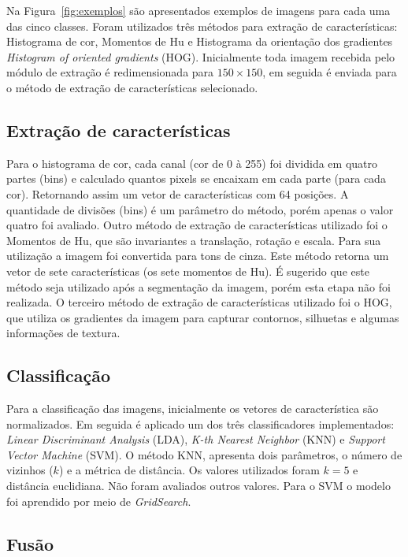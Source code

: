 \documentclass[journal]{IEEEtran}
\begin{document}
Na Figura~\ref{fig:exemplos} são apresentados exemplos de imagens para cada uma das cinco classes.
Foram utilizados três métodos para extração de características: Histograma de cor, Momentos de Hu e Histograma da orientação dos gradientes {\it Histogram of oriented gradients} (HOG).
Inicialmente toda imagem recebida pelo módulo de extração é redimensionada para $150 \times 150$, em seguida é enviada para o método de extração de características selecionado.

\subsection{Extração de características}

Para o histograma de cor, cada canal (cor de 0 à 255) foi dividida em quatro partes (bins) e calculado quantos pixels se encaixam em cada parte (para cada cor). 
Retornando assim um vetor de características com 64 posições.
A quantidade de divisões (bins) é um parâmetro do método, porém apenas o valor quatro foi avaliado.
Outro método de extração de características utilizado foi o Momentos de Hu, que são invariantes a translação, rotação e escala.
Para sua utilização a imagem foi convertida para tons de cinza. Este método retorna um vetor de sete características (os sete momentos de Hu).
É sugerido que este método seja utilizado após a segmentação da imagem, porém esta etapa não foi realizada.
O terceiro método de extração de características utilizado foi o HOG, que utiliza os gradientes da imagem para capturar contornos, silhuetas e algumas informações de textura.

\subsection{Classificação}

Para a classificação das imagens, inicialmente os vetores de característica são normalizados.
Em seguida é aplicado um dos três classificadores implementados: {\it Linear Discriminant Analysis} (LDA), {\it K-th Nearest Neighbor} (KNN) e {\it Support Vector Machine } (SVM).
O método KNN, apresenta dois parâmetros, o número de vizinhos ($k$) e a métrica de distância.
Os valores utilizados foram $k=5$ e distância euclidiana. Não foram avaliados outros valores.
Para o SVM o modelo foi aprendido por meio de {\it GridSearch}.

\subsection {Fusão}
\end{document}
